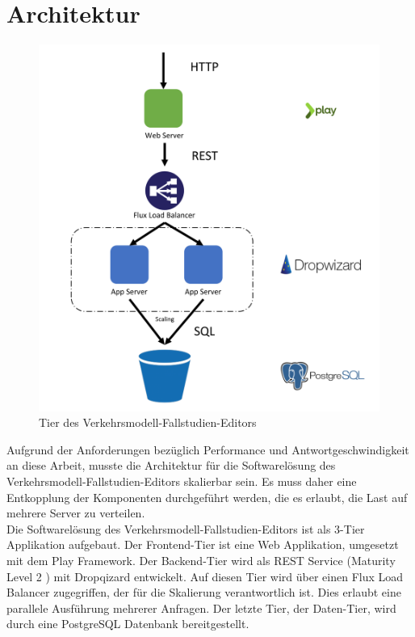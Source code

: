 \section{Architektur}
\begin{figure}[H]
\centering
\includegraphics[height=12cm]{images/Architektur.png}
\caption{Tier des Verkehrsmodell-Fallstudien-Editors}
\label{tier_architecture}
\end{figure}
Aufgrund der Anforderungen bezüglich Performance und Antwortgeschwindigkeit an diese Arbeit, musste die Architektur für die Softwarelösung des Verkehrsmodell-Fallstudien-Editors skalierbar sein. Es muss daher eine Entkopplung der Komponenten durchgeführt werden, die es erlaubt, die Last auf mehrere Server zu verteilen.\\
Die Softwarelösung des Verkehrsmodell-Fallstudien-Editors ist als 3-Tier Applikation aufgebaut. Der Frontend-Tier ist eine Web Applikation, umgesetzt mit dem Play Framework. Der Backend-Tier wird als REST Service (Maturity Level 2 \cite{RESTMaturity}) mit Dropqizard entwickelt. Auf diesen Tier wird über einen Flux Load Balancer zugegriffen, der für die Skalierung verantwortlich ist. Dies erlaubt eine parallele Ausführung mehrerer Anfragen. Der letzte Tier, der Daten-Tier, wird durch eine PostgreSQL Datenbank bereitgestellt.
